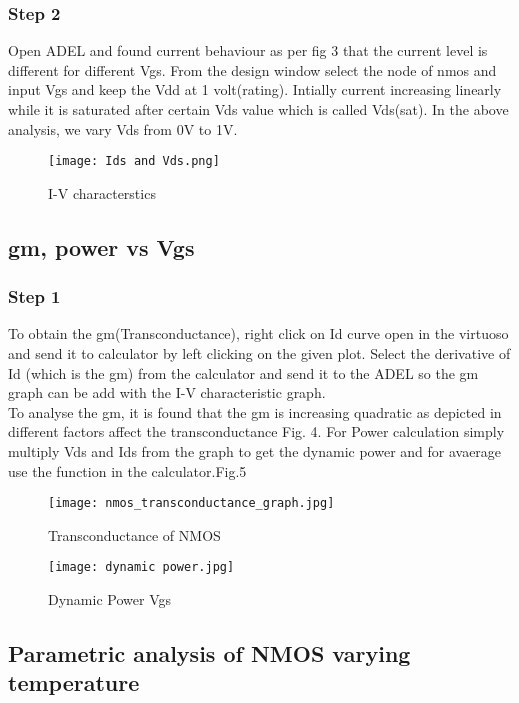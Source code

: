 \documentclass[conference]{IEEEtran}
\begin{document}
\subsubsection{Step 2}
Open ADEL and found current behaviour as per fig 3 that the current level is different for different Vgs. From the design window select the node of nmos and input Vgs and keep the Vdd at 1 volt(rating). Intially current increasing linearly while it is saturated after certain Vds value which is called Vds(sat). In the above analysis, we vary Vds from 0V to 1V.
\begin{figure}
    \centering
    \texttt{[image: Ids and Vds.png]}
    \caption{I-V characterstics}
    \label{fig:enter-label}
\end{figure}



\subsection{gm, power vs Vgs}
\subsubsection{Step 1}
To obtain the  gm(Transconductance), right click on Id curve open in the virtuoso and send it to calculator by left clicking on the given plot. Select the derivative of Id (which is the gm) from the calculator and send it to the ADEL so the gm graph can be add with the I-V characteristic graph.\\
To analyse the gm, it is found that the gm is increasing quadratic as depicted in different factors affect the transconductance Fig. 4.
For Power calculation simply multiply Vds and Ids from the graph to get the dynamic power and for avaerage use the function in the calculator.Fig.5
\begin{figure}
    \centering
    \texttt{[image: nmos\_transconductance\_graph.jpg]}
    \caption{Transconductance of NMOS}
    \label{fig:enter-label}
\end{figure}

\begin{figure}
    \centering
    \texttt{[image: dynamic power.jpg]}
    \caption{Dynamic Power Vgs}
    \label{fig:enter-label}
\end{figure}





\subsection{Parametric analysis of NMOS varying temperature}
\end{document}
